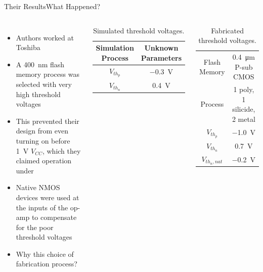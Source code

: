 \documentclass[aspectratio=1610]{beamer} %
\begin{document}
\begin{frame}{Their Results}{What Happened?}

    \begin{columns}[c]
        \begin{itemize}
            \item Authors worked at Toshiba
            \item A \qty{400}{\nm} flash memory process was selected with very high threshold voltages
            \item This prevented their design from even turning on before \qty{1}{\V} \(V_{CC}\), which they claimed operation under
            \item Native NMOS devices were used at the inputs of the op-amp to compensate for the poor threshold voltages
            \item Why this choice of fabrication process?
        \end{itemize}
    
        \begin{table}[]
            \centering
            \begin{tabular}{c|c}
            \toprule
                Simulation Process & Unknown Parameters \\
            \midrule
                \(V_{th_p}\) & \qty{-0.3}{\V} \\
                \(V_{th_n}\) & \qty{0.4}{\V} \\
            \bottomrule
            \end{tabular}
            \caption{Simulated threshold voltages.}
            \label{tab:sim_th}
        \end{table}
        \begin{table}[]
            \centering
            \begin{tabular}{c|c}
            \toprule
                Flash Memory & \qty{0.4}{\um} P-sub CMOS \\
                Process &  1 poly, 1 silicide, 2 metal \\
            \midrule
                \(V_{th_p}\) & \qty{-1.0}{\V} \\
                \(V_{th_n}\) & \qty{0.7}{\V} \\
                \(V_{th_n,nat}\) & \qty{-0.2}{\V} \\
            \bottomrule
            \end{tabular}
            \caption{Fabricated threshold voltages.}
            \label{tab:fab_th}
        \end{table}
    \end{columns}
\end{frame}
\end{document}
